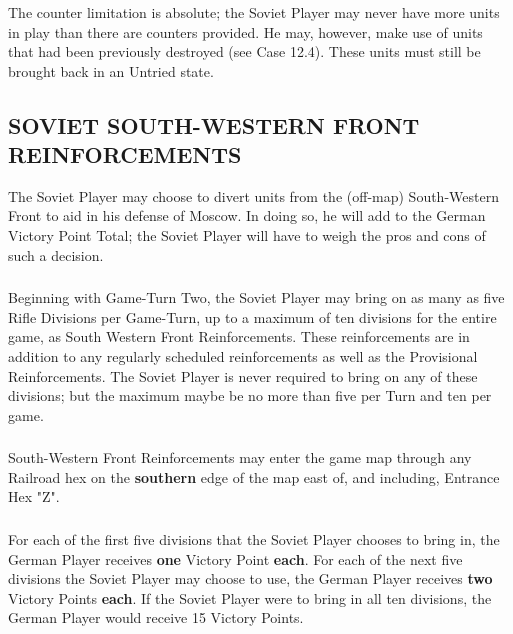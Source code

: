 \subsubsection{} The counter limitation is absolute; the Soviet Player may never have more units in play than there are counters provided. He may, however, make use of units that had been previously destroyed (see Case 12.4). These units must still be brought back in an Untried state.

\subsection{SOVIET SOUTH-WESTERN FRONT REINFORCEMENTS}

The Soviet Player may choose to divert units from the (off-map) South-Western Front to aid in his defense of Moscow. In doing so, he will add to the German Victory Point Total; the Soviet Player will have to weigh the pros and cons of such a decision.

\subsubsection{} Beginning with Game-Turn Two, the Soviet Player may bring on as many as five Rifle Divisions per Game-Turn, up to a maximum of ten divisions for the entire game, as South Western Front Reinforcements. These reinforcements are in addition to any regularly scheduled reinforcements as well as the Provisional Reinforcements. The Soviet Player is never required to bring on any of these divisions; but the maximum maybe be no more than five per Turn and ten per game.

\subsubsection{} South-Western Front Reinforcements may enter the game map through any Railroad hex on the \textbf{southern} edge of the map east of, and including, Entrance Hex "Z".

\subsubsection{} For each of the first five divisions that the Soviet Player chooses to bring in, the German Player receives \textbf{one} Victory Point \textbf{each}. For each of the next five divisions the Soviet Player may choose to use, the German Player receives \textbf{two} Victory Points \textbf{each}. If the Soviet Player were to bring in all ten divisions, the German Player would receive 15 Victory Points.

